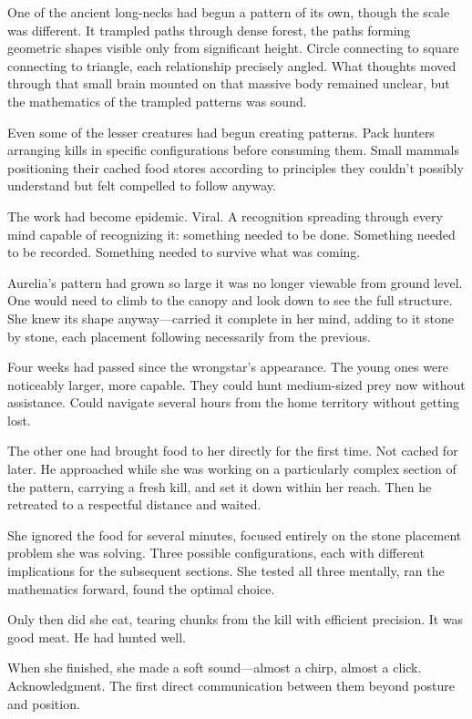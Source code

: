 One of the ancient long-necks had begun a pattern of its own, though the scale was different. It trampled paths through dense forest, the paths forming geometric shapes visible only from significant height. Circle connecting to square connecting to triangle, each relationship precisely angled. What thoughts moved through that small brain mounted on that massive body remained unclear, but the mathematics of the trampled patterns was sound.

Even some of the lesser creatures had begun creating patterns. Pack hunters arranging kills in specific configurations before consuming them. Small mammals positioning their cached food stores according to principles they couldn't possibly understand but felt compelled to follow anyway.

The work had become epidemic. Viral. A recognition spreading through every mind capable of recognizing it: something needed to be done. Something needed to be recorded. Something needed to survive what was coming.

\scenebreak

Aurelia's pattern had grown so large it was no longer viewable from ground level. One would need to climb to the canopy and look down to see the full structure. She knew its shape anyway—carried it complete in her mind, adding to it stone by stone, each placement following necessarily from the previous.

Four weeks had passed since the wrongstar's appearance. The young ones were noticeably larger, more capable. They could hunt medium-sized prey now without assistance. Could navigate several hours from the home territory without getting lost.

The other one had brought food to her directly for the first time. Not cached for later. He approached while she was working on a particularly complex section of the pattern, carrying a fresh kill, and set it down within her reach. Then he retreated to a respectful distance and waited.

She ignored the food for several minutes, focused entirely on the stone placement problem she was solving. Three possible configurations, each with different implications for the subsequent sections. She tested all three mentally, ran the mathematics forward, found the optimal choice.

Only then did she eat, tearing chunks from the kill with efficient precision. It was good meat. He had hunted well.

When she finished, she made a soft sound—almost a chirp, almost a click. Acknowledgment. The first direct communication between them beyond posture and position.

